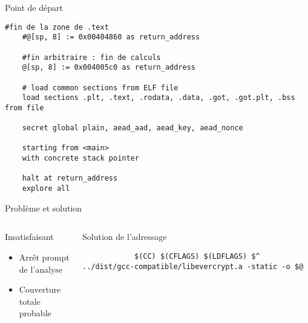 \documentclass[A4,svgnames,9pt,aspectratio=169]{beamer}
\begin{document}

\begin{frame}[fragile]{Point de départ}
  \begin{lstlisting}[style=INIStyle, caption={script.ini}, gobble=4]
    #fin de la zone de .text
    #@[sp, 8] := 0x00404860 as return_address
    
    #fin arbitraire : fin de calculs
    @[sp, 8] := 0x004005c0 as return_address
    
    # load common sections from ELF file
    load sections .plt, .text, .rodata, .data, .got, .got.plt, .bss from file
    
    secret global plain, aead_aad, aead_key, aead_nonce
    
    starting from <main>
    with concrete stack pointer
    
    halt at return_address
    explore all
  \end{lstlisting}
\end{frame}


\begin{frame}[fragile]{Problème et solution}

  \begin{columns}
    \begin{column}{0.3\textwidth}
      \begin{block}{Insatisfaisant}
      \begin{itemize}
        \item Arrêt prompt de l'analyse
        \item Couverture totale probable
      \end{itemize}
      \end{block}
    \end{column}
    \pause
    \begin{column}{0.7\textwidth}
      \begin{block}{Solution de l'adressage}  
        \begin{lstlisting}[style=MakefileStyle, caption={tests/Makefile}, gobble=10]
          %.exe: %.o
            $(CC) $(CFLAGS) $(LDFLAGS) $^ ../dist/gcc-compatible/libevercrypt.a -static -o $@
        \end{lstlisting}
      \end{block}
    \end{column}
  \end{columns}
\end{frame}
\end{document}
